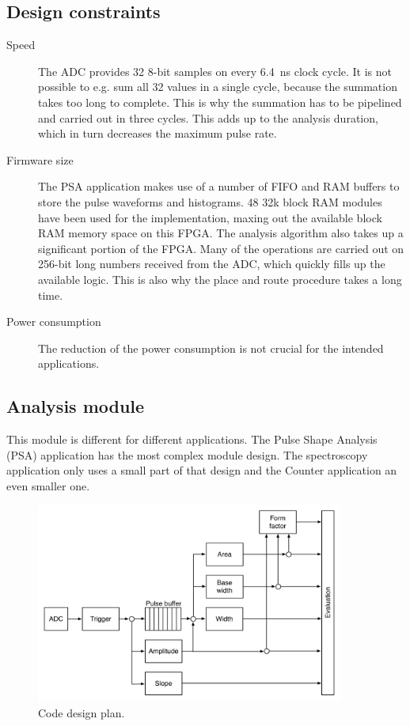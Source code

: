 \subsection{Design constraints}
\begin{description}
\item[Speed] The ADC provides 32 8-bit samples on every 6.4~ns clock cycle. It is not possible to e.g. sum all 32 values in a single cycle, because the summation takes too long to complete. This is why the summation has to be pipelined and carried out in three cycles. This adds up to the analysis duration, which in turn decreases the maximum pulse rate.
\item[Firmware size] The PSA application makes use of a number of FIFO and RAM buffers to store the pulse waveforms and histograms. 48 32k block RAM modules have been used for the implementation, maxing out the available block RAM memory space on this FPGA. The analysis algorithm also takes up a significant portion of the FPGA. Many of the operations are carried out on 256-bit long numbers received from the ADC, which quickly fills up the available logic. This is also why the place and route procedure takes a long time.
\item[Power consumption] The reduction of the power consumption is not crucial for the intended applications.
\end{description}


\subsection{Analysis module}
\label{subsec:algorithm}
This module is different for different applications. The Pulse Shape Analysis (PSA) application has the most complex module design. The spectroscopy application only uses a small part of that design and the Counter application an even smaller one.


\begin{figure}[!t]
\centering
\includegraphics[width=0.9\textwidth]{05_current_monitoring/plots/analysis1}
\caption{Code design plan.}
\label{fig:architecture}
\end{figure}

